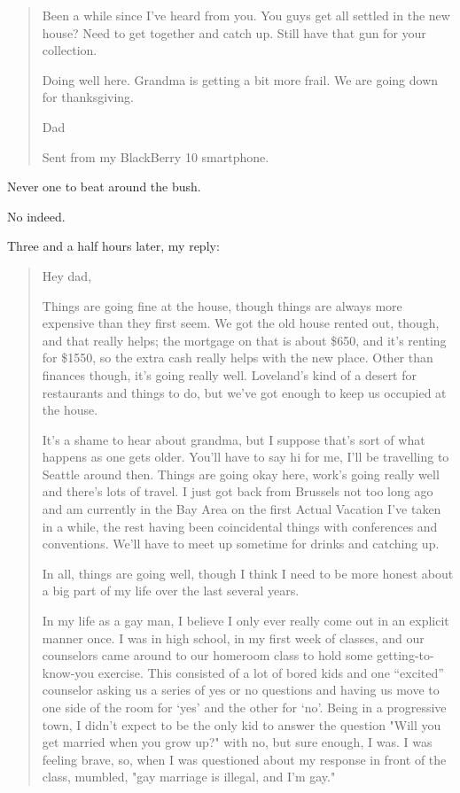 \begin{paracol}{2}
\begin{leftcolumn}
\begin{quotation}
Been a while since I've heard from you. You guys get all settled in the new house? Need to get together and catch up. Still have that gun for your collection.

Doing well here. Grandma is getting a bit more frail. We are going down for thanksgiving.

Dad

Sent from my BlackBerry 10 smartphone.
\end{quotation}

\begin{ally}
Never one to beat around the bush.
\end{ally}
No indeed.

Three and a half hours later, my reply:

\begin{quotation}
Hey dad,

Things are going fine at the house, though things are always more expensive than they first seem.  We got the old house rented out, though, and that really helps; the mortgage on that is about \$650, and it's renting for \$1550, so the extra cash really helps with the new place.  Other than finances though, it's going really well.  Loveland's kind of a desert for restaurants and things to do, but we've got enough to keep us occupied at the house.

It's a shame to hear about grandma, but I suppose that's sort of what happens as one gets older.  You'll have to say hi for me, I'll be travelling to Seattle around then.  Things are going okay here, work's going really well and there's lots of travel.  I just got back from Brussels not too long ago and am currently in the Bay Area on the first Actual Vacation I've taken in a while, the rest having been coincidental things with conferences and conventions.  We'll have to meet up sometime for drinks and catching up.

In all, things are going well, though I think I need to be more honest about a big part of my life over the last several years.

In my life as a gay man, I believe I only ever really come out in an explicit manner once.  I was in high school, in my first week of classes, and our counselors came around to our homeroom class to hold some getting-to-know-you exercise.  This consisted of a lot of bored kids and one ``excited'' counselor asking us a series of yes or no questions and having us move to one side of the room for `yes' and the other for `no'.  Being in a progressive town, I didn't expect to be the only kid to answer the question "Will you get married when you grow up?" with no, but sure enough, I was.  I was feeling brave, so, when I was questioned about my response in front of the class, mumbled, "gay marriage is illegal, and I'm gay."


\end{quotation}
\end{leftcolumn}
\end{paracol}

